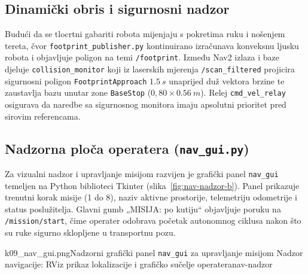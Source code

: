 \subsection{Dinamički obris i sigurnosni nadzor}
\label{sec:06-obris}

Budući da se tlocrtni gabariti robota mijenjaju s pokretima ruku i nošenjem tereta, čvor
\texttt{footprint\_publisher.py} kontinuirano izračunava konveksnu ljusku robota i objavljuje
poligon na temi \texttt{/footprint}. Između Nav2 izlaza i baze djeluje \texttt{collision\_monitor}
koji iz laserskih mjerenja \texttt{/scan\_filtered} projicira sigurnosni poligon
\texttt{FootprintApproach} $\SI{1.5}{s}$ unaprijed duž vektora brzine te zaustavlja bazu unutar zone
\texttt{BaseStop} ($0{,}80 \times \SI{0.56}{m}$). Relej \texttt{cmd\_vel\_relay} osigurava da
naredbe sa sigurnosnog monitora imaju apsolutni prioritet pred sirovim referencama.

\subsection{Nadzorna ploča operatera (\texttt{nav\_gui.py})}
\label{sec:06-gui}

Za vizualni nadzor i upravljanje misijom razvijen je grafički panel \texttt{nav\_gui} temeljen na
Python biblioteci Tkinter (slika~\ref{fig:nav-nadzor-b}). Panel prikazuje trenutni korak misije (1 do 8),
naziv aktivne prostorije, telemetriju odometrije i status poslužitelja. Glavni gumb „MISIJA: po kutiju“ objavljuje poruku na \texttt{/mission/start}, čime operater odobrava
početak autonomnog ciklusa nakon što su ruke sigurno sklopljene u transportnu pozu.

%
  {k09_nav_gui.png}{Nadzorni grafički panel \texttt{nav\_gui} za upravljanje misijom}%
  {Nadzor navigacije: RViz prikaz lokalizacije i grafičko sučelje operatera}{nav-nadzor}
